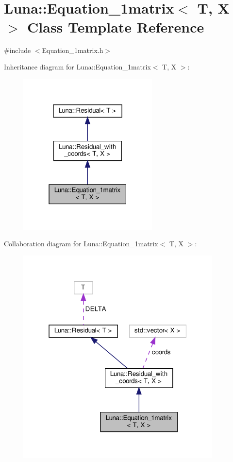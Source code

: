 \hypertarget{classLuna_1_1Equation__1matrix}{}\section{Luna\+:\+:Equation\+\_\+1matrix$<$ T, X $>$ Class Template Reference}
\label{classLuna_1_1Equation__1matrix}


{\ttfamily \#include $<$Equation\+\_\+1matrix.\+h$>$}



Inheritance diagram for Luna\+:\+:Equation\+\_\+1matrix$<$ T, X $>$\+:\nopagebreak
\begin{figure}[H]
\begin{center}
\leavevmode
\includegraphics[width=199pt]{classLuna_1_1Equation__1matrix__inherit__graph}
\end{center}
\end{figure}


Collaboration diagram for Luna\+:\+:Equation\+\_\+1matrix$<$ T, X $>$\+:\nopagebreak
\begin{figure}[H]
\begin{center}
\leavevmode
\includegraphics[width=292pt]{classLuna_1_1Equation__1matrix__coll__graph}
\end{center}
\end{figure}
